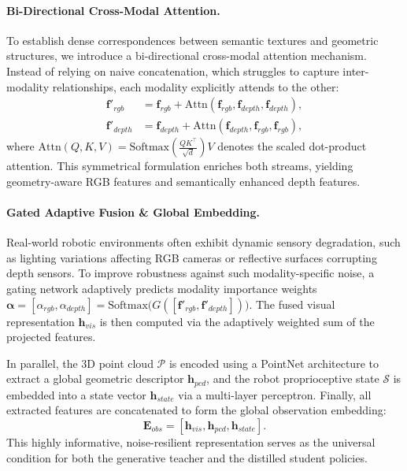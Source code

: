 \paragraph{Bi-Directional Cross-Modal Attention.}
To establish dense correspondences between semantic textures and geometric structures, we introduce a bi-directional cross-modal attention mechanism. Instead of relying on naive concatenation, which struggles to capture inter-modality relationships, each modality explicitly attends to the other:
\begin{align}
    \mathbf{f}'_{rgb} &= \mathbf{f}_{rgb} + \text{Attn}(\mathbf{f}_{rgb}, \mathbf{f}_{depth}, \mathbf{f}_{depth}), \\
    \mathbf{f}'_{depth} &= \mathbf{f}_{depth} + \text{Attn}(\mathbf{f}_{depth}, \mathbf{f}_{rgb}, \mathbf{f}_{rgb}),
\end{align}
where $\text{Attn}(Q, K, V) = \text{Softmax}\left(\frac{QK^\top}{\sqrt{d}}\right)V$ denotes the scaled dot-product attention. This symmetrical formulation enriches both streams, yielding geometry-aware RGB features and semantically enhanced depth features.

\paragraph{Gated Adaptive Fusion \& Global Embedding.}
Real-world robotic environments often exhibit dynamic sensory degradation, such as lighting variations affecting RGB cameras or reflective surfaces corrupting depth sensors. To improve robustness against such modality-specific noise, a gating network adaptively predicts modality importance weights $\boldsymbol{\alpha} = [\alpha_{rgb}, \alpha_{depth}] = \text{Softmax}\bigl(G([\mathbf{f}'_{rgb}, \mathbf{f}'_{depth}])\bigr)$. The fused visual representation $\mathbf{h}_{vis}$ is then computed via the adaptively weighted sum of the projected features.

In parallel, the 3D point cloud $\mathcal{P}$ is encoded using a PointNet architecture to extract a global geometric descriptor $\mathbf{h}_{pcd}$, and the robot proprioceptive state $\mathcal{S}$ is embedded into a state vector $\mathbf{h}_{state}$ via a multi-layer perceptron. Finally, all extracted features are concatenated to form the global observation embedding:
\begin{equation}
    \mathbf{E}_{obs} = [\mathbf{h}_{vis}, \mathbf{h}_{pcd}, \mathbf{h}_{state}].
\end{equation}
This highly informative, noise-resilient representation serves as the universal condition for both the generative teacher and the distilled student policies.

